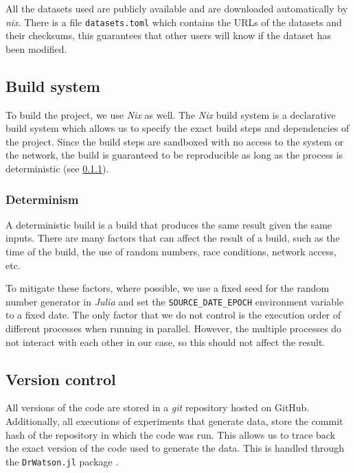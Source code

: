 All the datasets used are publicly available and are downloaded automatically by \emph{nix}. There
is a file \texttt{datasets.toml} which contains the URLs of the datasets and their checksums, this
guarantees that other users will know if the dataset has been modified.

\subsection{Build system}

To build the project, we use \emph{Nix} as well. The \emph{Nix} build system is a declarative
build system which allows us to specify the exact build steps and dependencies of the project. Since
the build steps are sandboxed with no access to the system or the network, the build is guaranteed
to be reproducible as long as the process is deterministic (see \cref{sub:deterministic}).

\subsubsection{Determinism}
\label{sub:deterministic}

A deterministic build is a build that produces the same result given the same inputs. There are
many factors that can affect the result of a build, such as the time of the build, the use of random
numbers, race conditions, network access, etc.

To mitigate these factors, where possible, we use a fixed seed for the random number generator in
\emph{Julia} and set the \texttt{SOURCE\_DATE\_EPOCH} environment variable to a fixed date. The only
factor that we do not control is the execution order of different processes when running in parallel.
However, the multiple processes do not interact with each other in our case, so this should not
affect the result.

\subsection{Version control}

All versions of the code are stored in a \emph{git} repository hosted on GitHub. %
Additionally, all executions of experiments that generate data, store the commit hash of the
repository in which the code was run. This allows us to trace back the exact version of the code
used to generate the data. This is handled through the \texttt{DrWatson.jl} package \cite{datserisDrWatsonPerfectSidekick2020a}.

